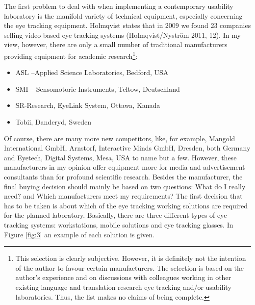 \documentclass[output=paper]{langsci/langscibook}
\begin{document}
The first problem to deal with when implementing a contemporary usability laboratory is the manifold variety of technical equipment, especially concerning the eye tracking equipment. Holmqvist states that {\textquotedbl}in 2009 we found 23 companies selling video based eye tracking systems{\textquotedbl} (Holmqvist/Nyström 2011, 12). In my view, however, there are only a small number of traditional manufacturers providing equipment for academic research\footnote{ This selection is clearly subjective. However, it is definitely not the intention of the author to favour certain manufacturers. The selection is based on the author’s experience and on discussions with colleagues working in other existing language and translation research eye tracking and/or usability laboratories. Thus, the list makes no claims of being complete.}: 

\begin{itemize}
\item ASL –Applied Science Laboratories, Bedford, USA
\item SMI – Sensomotoric Instruments, Teltow, Deutschland
\item SR-Research, EyeLink System, Ottawa, Kanada
\item Tobii, Danderyd, Sweden 
\end{itemize}


Of course, there are many more new competitors, like, for example, Mangold International GmbH, Arnstorf, Interactive Minds GmbH, Dresden, both Germany and Eyetech, Digital Systems, Mesa, USA to name but a few. However, these manufacturers in my opinion offer equipment more for media and advertisement consultants than for profound scientific research. Besides the manufacturer, the final buying decision should mainly be based on two questions: {\textquotedbl}What do I really need?{\textquotedbl} and {\textquotedbl}Which manufacturers meet my requirements?{\textquotedbl} The first decision that has to be taken is about which of the eye tracking working solutions are required for the planned laboratory. Basically, there are three different types of eye tracking systems: workstations, mobile solutions and eye tracking glasses. In Figure \ref{fig:3} an example of each solution is given.
\end{document}
